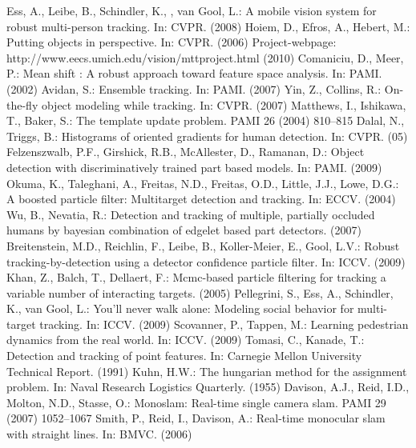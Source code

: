 \documentclass[10pt]{llncs}
\begin{document}

\begin{thebibliography}{99}

 Ess, A., Leibe, B., Schindler, K., , van Gool, L.: A mobile vision system for robust
multi-person tracking. In: CVPR. (2008)
 Hoiem, D., Efros, A., Hebert, M.: Putting objects in perspective. In: CVPR. (2006)
Project-webpage: http://www.eecs.umich.edu/vision/mttproject.html (2010)
Comaniciu, D., Meer, P.: Mean shift : A robust approach toward feature space
analysis. In: PAMI. (2002)
Avidan, S.: Ensemble tracking. In: PAMI. (2007)
Yin, Z., Collins, R.: On-the-fly object modeling while tracking. In: CVPR. (2007)
 Matthews, I., Ishikawa, T., Baker, S.: The template update problem. PAMI 26
(2004) 810–815
 Dalal, N., Triggs, B.: Histograms of oriented gradients for human detection. In: CVPR. (05)
 Felzenszwalb, P.F., Girshick, R.B., McAllester, D., Ramanan, D.: Object detection
with discriminatively trained part based models. In: PAMI. (2009)
 Okuma, K., Taleghani, A., Freitas, N.D., Freitas, O.D., Little, J.J., Lowe, D.G.: A
boosted particle filter: Multitarget detection and tracking. In: ECCV. (2004)
 Wu, B., Nevatia, R.: Detection and tracking of multiple, partially occluded humans
by bayesian combination of edgelet based part detectors. (2007)
 Breitenstein, M.D., Reichlin, F., Leibe, B., Koller-Meier, E., Gool, L.V.: Robust tracking-by-detection using a detector confidence particle filter. In: ICCV. (2009)
 Khan, Z., Balch, T., Dellaert, F.: Mcmc-based particle filtering for tracking a
variable number of interacting targets. (2005)
 Pellegrini, S., Ess, A., Schindler, K., van Gool, L.: You’ll never walk alone: Modeling
social behavior for multi-target tracking. In: ICCV. (2009)
 Scovanner, P., Tappen, M.: Learning pedestrian dynamics from the real world. In:
ICCV. (2009)
 Tomasi, C., Kanade, T.: Detection and tracking of point features. In: Carnegie
Mellon University Technical Report. (1991)
 Kuhn, H.W.: The hungarian method for the assignment problem. In: Naval Research Logistics Quarterly. (1955)
 Davison, A.J., Reid, I.D., Molton, N.D., Stasse, O.: Monoslam: Real-time single camera slam. PAMI 29 (2007) 1052–1067
 Smith, P., Reid, I., Davison, A.: Real-time monocular slam with straight lines. In: BMVC. (2006)

\end{thebibliography}
\end{document}
